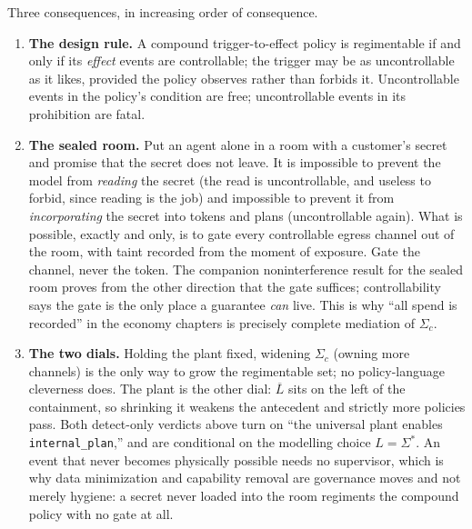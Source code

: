 \documentclass[11pt,a4paper]{article}
\theoremstyle{definition}
\theoremstyle{remark}
\begin{document}
Three consequences, in increasing order of consequence.
\begin{enumerate}[leftmargin=1.6em,itemsep=2pt]
\item \textbf{The design rule.} A compound trigger-to-effect policy is regimentable if and
  only if its \emph{effect} events are controllable; the trigger may be as uncontrollable as it
  likes, provided the policy observes rather than forbids it. Uncontrollable events in the
  policy's condition are free; uncontrollable events in its prohibition are fatal.
\item \textbf{The sealed room.} Put an agent alone in a room with a customer's secret and
  promise that the secret does not leave. It is impossible to prevent the model from
  \emph{reading} the secret (the read is uncontrollable, and useless to forbid, since reading is
  the job) and impossible to prevent it from \emph{incorporating} the secret into tokens and
  plans (uncontrollable again). What is possible, exactly and only, is to gate every
  controllable egress channel out of the room, with taint recorded from the moment of
  exposure. Gate the channel, never the token. The companion noninterference result for the
  sealed room proves from the other direction that the gate suffices; controllability says the
  gate is the only place a guarantee \emph{can} live. This is why ``all spend is recorded'' in
  the economy chapters is precisely complete mediation of $\Sigma_c$.
\item \textbf{The two dials.} Holding the plant fixed, widening $\Sigma_c$ (owning more
  channels) is the only way to grow the regimentable set; no policy-language cleverness does.
  The plant is the other dial: $\overline{L}$ sits on the left of the containment, so shrinking
  it weakens the antecedent and strictly more policies pass. Both detect-only verdicts above
  turn on ``the universal plant enables \texttt{internal\_plan},'' and are conditional on the
  modelling choice $L = \Sigma^{*}$. An event that never becomes physically possible needs no
  supervisor, which is why data minimization and capability removal are governance moves and
  not merely hygiene: a secret never loaded into the room regiments the compound policy with
  no gate at all.
\end{enumerate}
\end{document}
